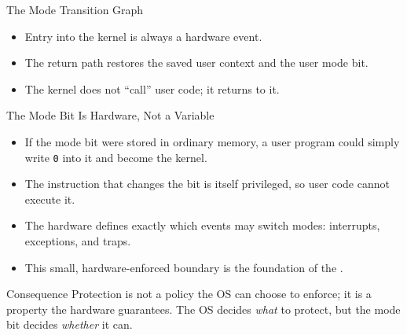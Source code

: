 \documentclass[aspectratio=169]{beamer}
\begin{document}
\begin{frame}{The Mode Transition Graph}
  \centering
  \vspace{0.3cm}
  \begin{itemize}
    \item Entry into the kernel is always a  hardware event.
    \item The return path restores the saved user context and the user mode bit.
    \item The kernel does not ``call'' user code; it returns to it.
  \end{itemize}
\end{frame}

\begin{frame}{The Mode Bit Is Hardware, Not a Variable}
  \begin{itemize}
    \item If the mode bit were stored in ordinary memory, a user program could
      simply write \texttt{0} into it and become the kernel.
    \item The instruction that changes the bit is itself privileged, so user
      code cannot execute it.
    \item The hardware defines exactly which events may switch modes:
      interrupts, exceptions, and traps.
    \item This small, hardware-enforced boundary is the foundation of the
      .
  \end{itemize}
  \vspace{0.2cm}
  \begin{block}{Consequence}
    Protection is not a policy the OS can choose to enforce; it is a property
    the hardware guarantees. The OS decides \emph{what} to protect, but the
    mode bit decides \emph{whether} it can.
  \end{block}
\end{frame}
\end{document}
